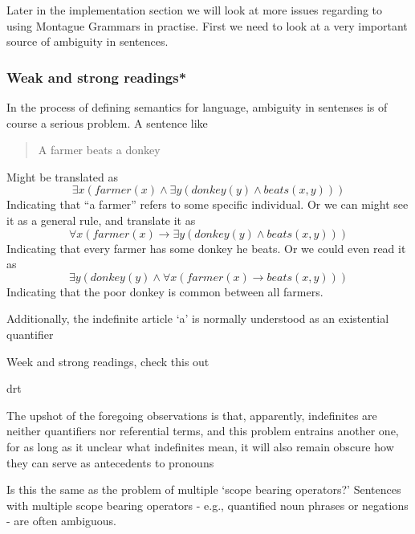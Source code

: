 \documentclass[12pt]{article}
\begin{document}
Later in the implementation section we will look at more issues regarding to using Montague Grammars in practise. First we need to look at a very important source of ambiguity in sentences.

\subsubsection{Weak and strong readings*}

In the process of defining semantics for language, ambiguity in sentenses is of course a serious problem. A sentence like  
\begin{quotation}
A farmer beats a donkey
\end{quotation}
Might be translated as 
\begin{equation}
\exists x ( farmer(x) \wedge \exists y ( donkey(y) \wedge beats(x,y)))
\end{equation}
Indicating that ``a farmer'' refers to some specific individual. Or we can might see it as a general rule, and translate it as
\begin{equation}
\forall x ( farmer(x) \rightarrow \exists y ( donkey(y) \wedge beats(x,y)))
\end{equation}
Indicating that every farmer has some donkey he beats. Or we could even read it as
\begin{equation}
\exists y ( donkey(y) \wedge \forall x ( farmer(x) \rightarrow beats(x,y)))
\end{equation}
Indicating that the poor donkey is common between all farmers.

Additionally, the indefinite article `a' is normally understood as an existential quantifier

Week and strong readings, check this out \cite{kanazawa1994weak}


drt

The upshot of the foregoing observations is that, apparently, indefinites are neither quantifiers nor referential terms, and this problem entrains another one, for as long as it unclear what indefinites mean, it will also remain obscure how they can serve as antecedents to pronouns

Is this the same as the problem of multiple `scope bearing operators?'
Sentences with multiple scope bearing operators - e.g.,
quantified noun phrases or negations - are often ambiguous.

\end{document}
